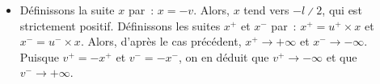 \begin{itemize}[nosep]
    \item Définissons la suite $x$ par : $x = -v$.
        Alors, $x$ tend vers $- l \divslash 2$, qui est strictement positif.
        Définissons les suites $x^+$ et $x^-$ par : $x^+ = u^+ \times x$ et $x^- = u^- \times x$.
        Alors, d'après le cas précédent, $x^+ \to +\infty$ et $x^- \to -\infty$.
        Puisque $v^+ = - x^+$ et $v^- = - x^-$, on en déduit que $v^+ \to -\infty$ et que $v^- \to +\infty$.
\end{itemize}

\done

%
%
%
%
%

